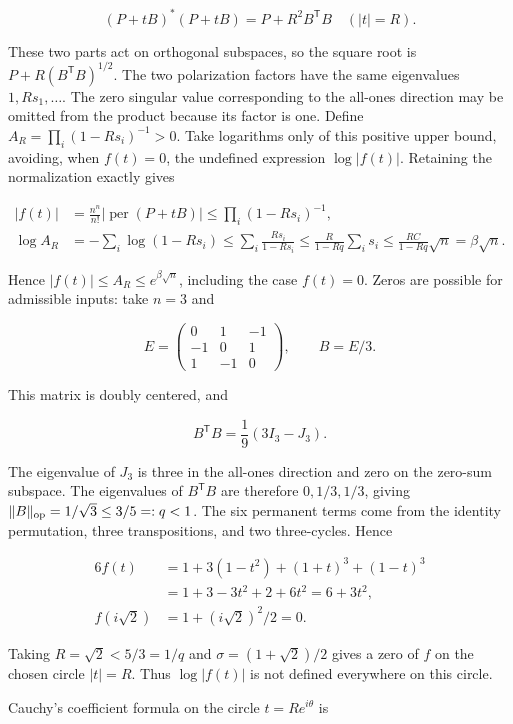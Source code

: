\documentclass[11pt,a4paper]{article}
\begin{document}
\[
(P+tB)^*(P+tB)=P+R^2B^{\mathsf T}B
\quad(|t|=R).
\]

These two parts act on orthogonal subspaces, so the square root is \(P+R(B^{\mathsf T}B)^{1/2}\). The two polarization factors have the same eigenvalues \(1,Rs_1,\ldots\). The zero singular value corresponding to the all-ones direction may be omitted from the product because its factor is one. Define \(A_R=\prod_i(1-Rs_i)^{-1}>0\). Take logarithms only of this positive upper bound, avoiding, when \(f(t)=0\), the undefined expression \(\log|f(t)|\). Retaining the normalization exactly gives

\[
\begin{aligned}
|f(t)|&=\frac{n^n}{n!}|\operatorname{per}(P+tB)|
\le\prod_i(1-Rs_i)^{-1},\\
\log A_R&=-\sum_i\log(1-Rs_i)\le\sum_i\frac{Rs_i}{1-Rs_i}
\le\frac R{1-Rq}\sum_i s_i
\le\frac{RC}{1-Rq}\sqrt n=\beta\sqrt n.
\end{aligned}
\]

Hence \(|f(t)|\le A_R\le e^{\beta\sqrt n}\), including the case \(f(t)=0\). Zeros are possible for admissible inputs: take \(n=3\) and

\[
E=\begin{pmatrix}0&1&-1\\-1&0&1\\1&-1&0\end{pmatrix},\qquad B=E/3.
\]

This matrix is doubly centered, and

\[
B^{\mathsf T}B=\frac19(3I_3-J_3).
\]

The eigenvalue of \(J_3\) is three in the all-ones direction and zero on the zero-sum subspace. The eigenvalues of \(B^{\mathsf T}B\) are therefore \(0,1/3,1/3\), giving \(\|B\|_{\rm op}=1/\sqrt3\le3/5=:q<1\). The six permanent terms come from the identity permutation, three transpositions, and two three-cycles. Hence

\[
\begin{aligned}
6f(t)&=1+3(1-t^2)+(1+t)^3+(1-t)^3\\
&=1+3-3t^2+2+6t^2=6+3t^2,\\
f(i\sqrt2)&=1+(i\sqrt2)^2/2=0.
\end{aligned}
\]

Taking \(R=\sqrt2<5/3=1/q\) and \(\sigma=(1+\sqrt2)/2\) gives a zero of \(f\) on the chosen circle \(|t|=R\). Thus \(\log|f(t)|\) is not defined everywhere on this circle.

Cauchy's coefficient formula on the circle \(t=Re^{i\theta}\) is
\end{document}
